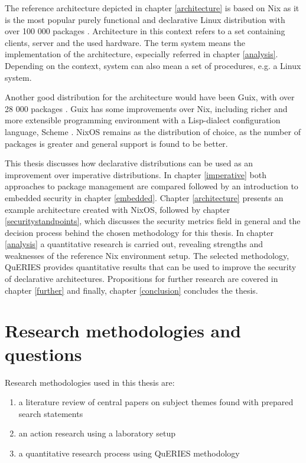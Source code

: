 The reference architecture depicted in chapter \ref{architecture} is
based on Nix as it is the most popular purely functional and declarative
Linux distribution with over 100 000 packages
\cite{nixosNixOSSearch}. Architecture in this context refers to a 
set containing clients, server and the used hardware. The term
system means the implementation of the architecture, especially
referred in chapter \ref{analysis}. Depending on the context, system
can also mean a set of procedures, e.g. a Linux system. 

Another good distribution for the architecture would have been Guix, with over
28 000 packages \cite{gnuPackagesx2014}. Guix has some improvements
over Nix, including richer and more extensible programming environment
with a Lisp-dialect configuration language, Scheme
\cite{courtes2021deploiements}. NixOS remains as the distribution of
choice, as the number of packages is greater and general support is
found to be better.

This thesis discusses how declarative distributions can be used as an
improvement over imperative distributions. In chapter \ref{imperative}
both approaches to package management are compared followed by an
introduction to embedded security in chapter \ref{embedded}. Chapter
\ref{architecture} presents an example architecture created with
NixOS, followed by chapter \ref{securitystandpoints}, which discusses
the security metrics field in general and the decision process behind
the chosen methodology for this thesis. In chapter \ref{analysis} a
quantitative research is carried out, revealing strengths and
weaknesses of the reference Nix environment setup. The selected
methodology, QuERIES provides quantitative results that can be used to
improve the security of declarative architectures. Propositions for
further research are covered in chapter \ref{further} and finally,
chapter \ref{conclusion} concludes the thesis.

\section{Research methodologies and questions}

Research methodologies used in this thesis are:
\begin{enumerate}
\item a literature review of central papers on subject themes found
  with prepared search statements
\item an action research using a laboratory setup
\item a quantitative research process using QuERIES methodology
\end{enumerate}

